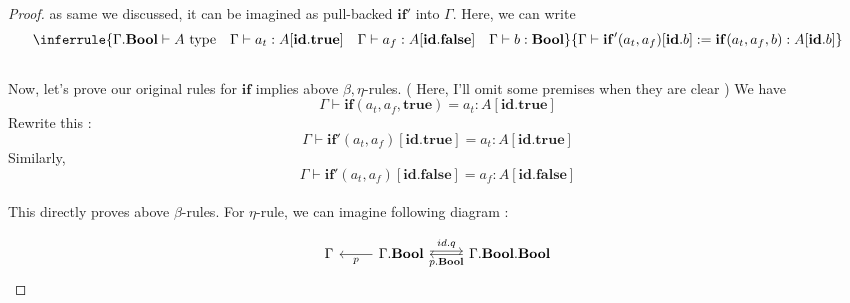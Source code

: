 \documentclass[12pt, a4paper, openany, twoside]{book}
\theoremstyle{definition}
\theoremstyle{remark}
\theoremstyle{plain}
\numberwithin{equation}{section}
\begin{document}
\begin{tcolorbox}[breakable, colback=yellow!10!white,colframe=brown!75!black,title=Exercise 3.3.5.]
\begin{proof}
as same we discussed, it can be imagined as pull-backed $\mathbf{if}'$ into $\Gamma$. Here, we can write 
\[
\inferrule
{
    \Gamma.\mathbf{Bool} \vdash A \text{ type} \quad \Gamma \vdash a_t : A[\mathbf{id}.\mathbf{true}] \quad \Gamma \vdash a_f : A[\mathbf{id}.\mathbf{false}] \quad \Gamma \vdash b : \mathbf{Bool}
}
{
    \Gamma \vdash \mathbf{if}'(a_t, a_f)[\mathbf{id}.b] := \mathbf{if}(a_t, a_f, b) : A[\mathbf{id}.b]
}
\]
\\
Now, let's prove our original rules for $\mathbf{if}$ implies above $\beta, \eta$-rules. ( Here, I'll omit some premises when they are clear )
We have 
\[\Gamma \vdash \mathbf{if}(a_t, a_f, \mathbf{true}) = a_t : A[{\mathbf{id.true}}]\]
Rewrite this : 
\[\Gamma \vdash \mathbf{if'}(a_t, a_f)[\mathbf{id.true}] = a_t : A[\mathbf{id.true}]\]
Similarly, 
\[\Gamma \vdash \mathbf{if'}(a_t, a_f)[\mathbf{id.false}] = a_f : A[\mathbf{id.false}]\]
\\
This directly proves above $\beta$-rules. For $\eta$-rule, we can imagine following diagram : 

\[
\begin{tikzcd}
    \Gamma & \Gamma.\mathbf{Bool} \arrow[l, "p"]  \arrow[shift left, r, "id.q"] &  \Gamma.\mathbf{Bool.Bool} \arrow[l, "p.\mathbf{Bool}"]
\end{tikzcd}
\]


\end{proof}
\end{tcolorbox}
\end{document}

